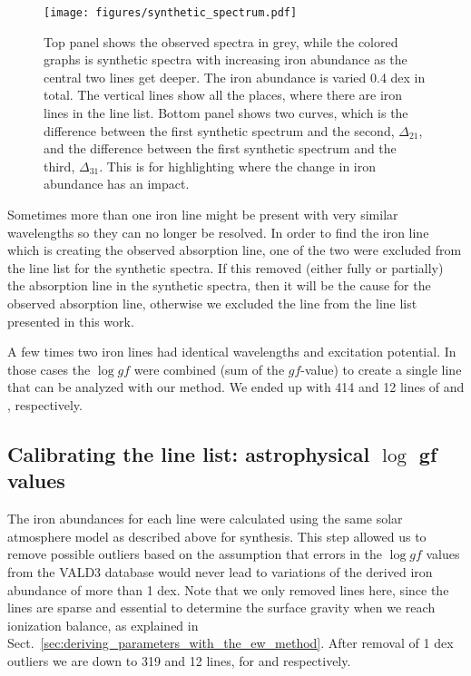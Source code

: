 \documentclass{aa}
\begin{document}
\begin{figure}[tpb]
    \centering
    \texttt{[image: figures/synthetic\_spectrum.pdf]}
    \caption{Top panel shows the observed spectra in grey, while the
    colored graphs is synthetic spectra with increasing iron abundance
    as the central two lines get deeper. The iron abundance is varied
    0.4 dex in total. The vertical lines show all the places, where there are
    iron lines in the line list. Bottom panel shows two curves, which is
    the difference between the first synthetic spectrum and the second,
    $\Delta_{21}$, and the difference between the first synthetic
    spectrum and the third, $\Delta_{31}$. This is for highlighting
    where the change in iron abundance has an impact.}
    \label{fig:synthesis}
\end{figure}


Sometimes more than one iron line might be present with very similar
wavelengths so they can no longer be resolved. In order to find the
iron line which is creating the observed
absorption line, one of the two were excluded from the line list for
the synthetic spectra. If this removed (either fully or partially) the
absorption line in the synthetic spectra, then it will be the cause for
the observed absorption line, otherwise we excluded the line from the line
list presented in this work.

A few times two iron lines had identical wavelengths and excitation
potential. In those cases the $\log \mathit{gf}$ were combined (sum of
the $\mathit{gf}$-value) to create a single line that can be analyzed
with our method. We ended up with 414 and 12 lines of  and
, respectively.


\subsection{Calibrating the line list: astrophysical $\log$ gf values}
\label{ssub:Recalibrating-the-atomic-data}

The iron abundances for each line were calculated using the same
solar atmosphere model as described above for synthesis. This step
allowed us to remove possible outliers based on the assumption that
errors in the $\log \mathit{gf}$ values from the VALD3 database
would never lead to variations of the derived iron abundance of more
than 1 dex. Note that we only removed  lines here, since
the  lines are sparse and essential to determine the
surface gravity when we reach ionization balance, as explained in
Sect.~\ref{sec:deriving_parameters_with_the_ew_method}. After removal
of 1 dex outliers we are down to 319 and 12 lines, for  and
 respectively.
\end{document}
